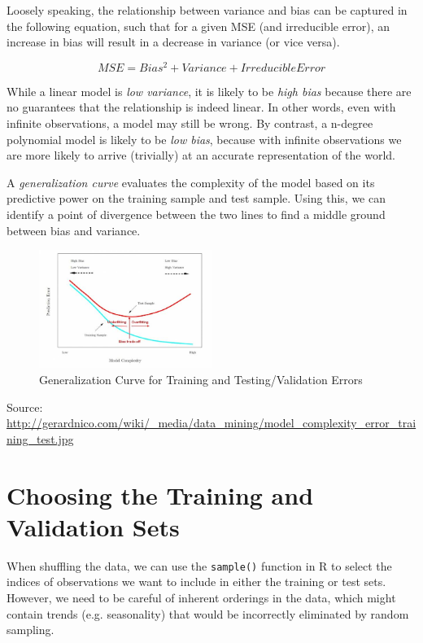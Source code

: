 Loosely speaking, the relationship between variance and bias can be captured in the following equation, such that for a given MSE (and irreducible error), an increase in bias will result in a decrease in variance (or vice versa).

\[MSE = Bias^2 + Variance + Irreducible Error\]

While a linear model is \emph{low variance}, it is likely to be \emph{high bias} because there are no guarantees that the relationship is indeed linear. In other words, even with infinite observations, a model may still be wrong. By contrast, a n-degree polynomial model is likely to be \emph{low bias}, because with infinite observations we are more likely to arrive (trivially) at an accurate representation of the world.

A \emph{generalization curve} evaluates the complexity of the model based on its predictive power on the training sample and test sample. Using this, we can identify a point of divergence between the two lines to find a middle ground between bias and variance.

\begin{figure}[h]
\begin{center}
\includegraphics[width=0.5\textwidth]{GeneralizationCurve.jpg}
\caption{Generalization Curve for Training and Testing/Validation Errors}
\end{center}
\end{figure}

\small{Source: \url {http://gerardnico.com/wiki/_media/data_mining/model_complexity_error_training_test.jpg}}

\section{Choosing the Training and Validation Sets}

When shuffling the data, we can use the \texttt{sample()} function in R to select the indices of observations we want to include in either the training or test sets. However, we need to be careful of inherent orderings in the data, which might contain trends (e.g. seasonality) that would be incorrectly eliminated by random sampling.


